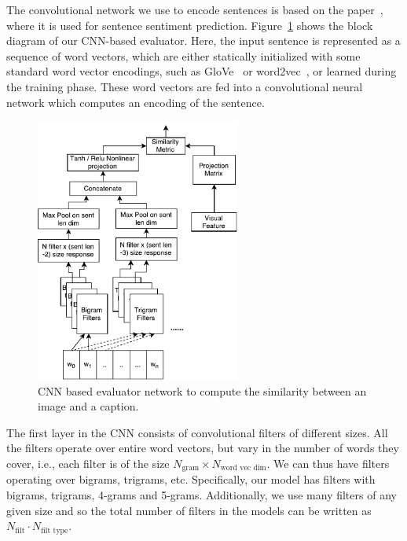 The convolutional network we use to encode sentences is based on the
paper~\cite{kim:2014:CNNsent}, where it is used for sentence sentiment
prediction.
Figure~\ref{fig:CNNEval} shows the block diagram of our CNN-based evaluator.  
Here, the input sentence is represented as a sequence of word vectors, which are
either statically initialized with some standard word vector encodings, such as
GloVe~\cite{pennington2014glove} or word2vec~\cite{mikolov2013distributed}, or
learned during the training phase.
These word vectors are fed into a convolutional neural network which computes an
encoding of the sentence.


\begin{figure}[t] 
  \centering
  \includegraphics[width=0.6\textwidth]{./images/CnnEval.pdf} 
  \caption{CNN based evaluator network to compute the similarity between 
    an image and a caption.}
  \label{fig:CNNEval} 
\end{figure}


The first layer in the CNN consists of convolutional filters of different sizes.  
All the filters operate over entire word vectors, but vary in the number of
words they cover, i.e., each filter is of the size $N_{\text{gram}} \times
N_{\text{word vec dim}}$. 
We can thus have filters operating over bigrams, trigrams, etc.
Specifically, our model has filters with bigrams, trigrams, 4-grams and 5-grams. 
Additionally, we use many filters of any given size and so the total number of
filters in the models can be written as $N_{\text{filt}} \cdot N_{\text{filt
type}}$.

